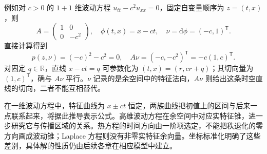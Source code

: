 \ProseParagraphBreak

例如对 \(c>0\) 的 \(1+1\) 维波动方程 \(u_{tt}-c^2u_{xx}=0\)，固定自变量顺序为 \(z=(t,x)\)，则
\[
 A=\begin{pmatrix}1&0\\0&-c^2\end{pmatrix},\quad
 \phi(t,x)=x-ct,\quad \nu=\mathrm d\phi=(-c,1)^{\mathsf T}.
\]
直接计算得到
\[
 p(z,\nu)=(-c)^2-c^2=0,\quad
 A\nu=(-c,-c^2)^{\mathsf T}=-c(1,c)^{\mathsf T}.
\]
对固定 \(q\in\mathbb R\)，直线 \(x-ct=q\) 可参数化为 \((t,x)=(r,cr+q)\)；其切向量为 \((1,c)^{\mathsf T}\)，确与 \(A\nu\) 平行。\(\nu\) 记录的是余空间中的特征法向，\(A\nu\) 则给出这条时空直线的切向，二者不能互相替代。

\ProseParagraphBreak

在一维波动方程中，特征曲线为 \(x\pm ct\) 恒定，两族曲线把初值上的区间与后来一点联系起来，将据此推导表示公式。高维波动方程在余空间中对应实特征锥，进一步研究它与传播区域的关系。热方程的时间方向由一阶项选定，不能把秩退化的零方向画成波动锥；Laplace 方程则没有非零实特征余向量。坐标标准化明确了这些差别，具体解的性质仍由后续各章在相应模型中建立。
